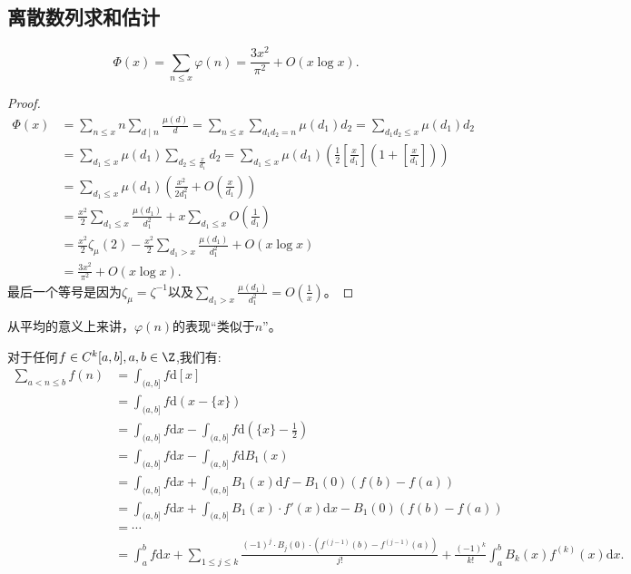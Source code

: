 \subsection{离散数列求和估计}
\begin{theorem}
    \[\Phi(x) = \sum_{n \leqslant x}\varphi(n) = \frac{3x^2}{\pi^2}+O(x\log x).\]
\end{theorem}
\begin{proof}
\begin{equation*}
    \begin{split}
        \Phi(x) & = \sum_{n \leqslant x}n\sum_{d \mid n}\frac{\mu(d)}{d} = \sum_{n \leqslant x}\sum_{d_1d_2 = n}\mu(d_1)d_2 = \sum_{d_1d_2 \leqslant x}\mu(d_1)d_2
        \\ & = \sum_{d_1 \leqslant x}\mu(d_1)\sum_{d_2 \leqslant \frac{x}{d_1}}d_2 = \sum_{d_1 \leqslant x}\mu(d_1)\left( \frac{1}{2}\left[ \frac{x}{d_1} \right]\left( 1+ \left[ \frac{x}{d_1} \right] \right) \right)
        \\ & = \sum_{d_1 \leqslant x}\mu(d_1)\left(\frac{x^2}{2d_1^2}+O\left(\frac{x}{d_1}\right)\right)
        \\ & = \frac{x^2}{2}\sum_{d_1 \leqslant x}\frac{\mu(d_1)}{d_1^2}+x\sum_{d_1 \leqslant x}O\left(\frac{1}{d_1}\right)
        \\ & = \frac{x^2}{2}\zeta_{\mu}(2)-\frac{x^2}{2}\sum_{d_1 > x}\frac{\mu(d_1)}{d_1^2}+O(x\log x)
        \\ & = \frac{3x^2}{\pi^2}+O(x\log x).
    \end{split}
\end{equation*}
最后一个等号是因为$\zeta_{\mu} = \zeta^{-1}$以及$\displaystyle \sum_{d_1>x}\frac{\mu(d_1)}{d_1^2} = O\left( \frac{1}{x} \right)$。
\end{proof}
\begin{remark}
    从平均的意义上来讲，$\varphi(n)$的表现“类似于$n$”。
\end{remark}

\begin{theorem}
对于任何$f\in C^k[a,b],a,b\in\Z$,我们有:
\begin{align}
    \sum_{a<n\leq b} f(n) &= \int_{(a,b]} f\mathrm{d}[x] \\
                        &= \int_{(a,b]} f\mathrm{d}(x-\{x\}) \\
                        &= \int_{(a,b]} f\mathrm{d}x - \int_{(a,b]}f\mathrm{d}(\{x\}-\frac12)\\
                        &= \int_{(a,b]} f\mathrm{d}x - \int_{(a,b]}f\mathrm{d}B_1(x) \\
                        &= \int_{(a,b]} f\mathrm{d}x + \int_{(a,b]}B_1(x)\mathrm{d}f - B_1(0)(f(b)-f(a)) \\
    &= \int_{(a,b]} f\mathrm{d}x + \int_{(a,b]}B_1(x) \cdot f'(x)\mathrm{d}x - B_1(0)(f(b)-f(a)) \\
    &= \cdots \\
    &= \int_a^bf\mathrm{d}x + \sum_{1\leq j\leq k}\frac{(-1)^j \cdot B_j(0) \cdot (f^{(j-1)}(b) - f^{(j-1)}(a))}{j!}+\frac{(-1)^k}{k!}\int_a^bB_k(x)f^{(k)}(x)\mathrm{d}x.\\
\end{align}

\end{theorem}

